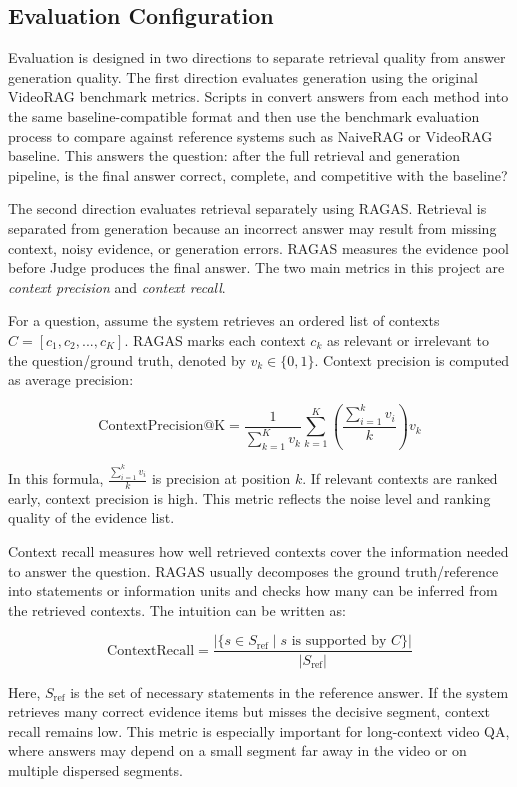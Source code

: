 \documentclass[12pt,a4paper]{article}
\newcommand{\codepath}[1]{\path{#1}}
\begin{document}
\subsection{Evaluation Configuration}

Evaluation is designed in two directions to separate retrieval quality from answer generation quality. The first direction evaluates generation using the original VideoRAG benchmark metrics. Scripts in \codepath{reproduce/quantitative_comparison/} convert answers from each method into the same baseline-compatible format and then use the benchmark evaluation process to compare against reference systems such as NaiveRAG or VideoRAG baseline. This answers the question: after the full retrieval and generation pipeline, is the final answer correct, complete, and competitive with the baseline?

The second direction evaluates retrieval separately using RAGAS. Retrieval is separated from generation because an incorrect answer may result from missing context, noisy evidence, or generation errors. RAGAS measures the evidence pool before Judge produces the final answer. The two main metrics in this project are \textit{context precision} and \textit{context recall}.

For a question, assume the system retrieves an ordered list of contexts $C = [c_1, c_2, ..., c_K]$. RAGAS marks each context $c_k$ as relevant or irrelevant to the question/ground truth, denoted by $v_k \in \{0, 1\}$. Context precision is computed as average precision:

\[
\mathrm{ContextPrecision@K} =
\frac{1}{\sum_{k=1}^{K} v_k}
\sum_{k=1}^{K}
\left(
\frac{\sum_{i=1}^{k} v_i}{k}
\right)
v_k
\]

In this formula, $\frac{\sum_{i=1}^{k} v_i}{k}$ is precision at position $k$. If relevant contexts are ranked early, context precision is high. This metric reflects the noise level and ranking quality of the evidence list.

Context recall measures how well retrieved contexts cover the information needed to answer the question. RAGAS usually decomposes the ground truth/reference into statements or information units and checks how many can be inferred from the retrieved contexts. The intuition can be written as:

\[
\mathrm{ContextRecall} =
\frac{
\left|\{s \in S_{\mathrm{ref}} \mid s \text{ is supported by } C\}\right|
}{
\left|S_{\mathrm{ref}}\right|
}
\]

Here, $S_{\mathrm{ref}}$ is the set of necessary statements in the reference answer. If the system retrieves many correct evidence items but misses the decisive segment, context recall remains low. This metric is especially important for long-context video QA, where answers may depend on a small segment far away in the video or on multiple dispersed segments.
\end{document}
